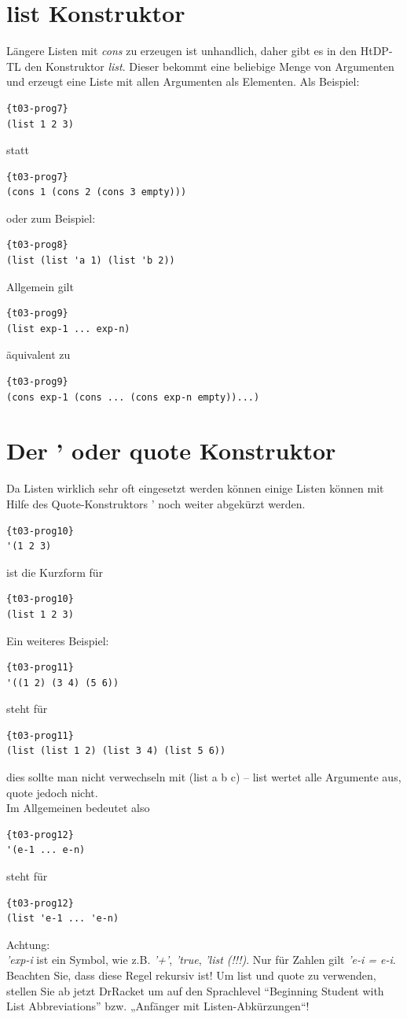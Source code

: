\section{list Konstruktor}
Längere Listen mit \textit{cons} zu erzeugen ist unhandlich, daher gibt es in den HtDP-TL den Konstruktor \textit{list}. Dieser bekommt eine beliebige Menge von Argumenten und erzeugt eine Liste mit allen Argumenten als Elementen. Als Beispiel:

\begin{lstlisting}{t03-prog7}
(list 1 2 3)
\end{lstlisting}
statt
\begin{lstlisting}{t03-prog7}
(cons 1 (cons 2 (cons 3 empty)))
\end{lstlisting}
oder zum Beispiel:
\begin{lstlisting}{t03-prog8}
(list (list 'a 1) (list 'b 2))
\end{lstlisting}

Allgemein gilt
\begin{lstlisting}{t03-prog9}
(list exp-1 ... exp-n)
\end{lstlisting}
 äquivalent zu
\begin{lstlisting}{t03-prog9}
(cons exp-1 (cons ... (cons exp-n empty))...)
\end{lstlisting}

\section{Der ' oder quote Konstruktor}
Da Listen wirklich sehr oft eingesetzt werden können einige Listen können mit Hilfe des Quote-Konstruktors ' noch weiter abgekürzt werden.
\begin{lstlisting}{t03-prog10}
'(1 2 3)
\end{lstlisting}
ist die Kurzform für
\begin{lstlisting}{t03-prog10}
(list 1 2 3)
\end{lstlisting}
Ein weiteres Beispiel:
\begin{lstlisting}{t03-prog11}
'((1 2) (3 4) (5 6))
\end{lstlisting}
steht für
\begin{lstlisting}{t03-prog11}
(list (list 1 2) (list 3 4) (list 5 6))
\end{lstlisting}
dies sollte man nicht verwechseln mit (list a b c) – list wertet alle
Argumente aus, quote jedoch nicht. \\Im Allgemeinen bedeutet also
\begin{lstlisting}{t03-prog12}
'(e-1 ... e-n)
\end{lstlisting}
steht für
\begin{lstlisting}{t03-prog12}
(list 'e-1 ... 'e-n)
\end{lstlisting}
Achtung:\\
\textit{'exp-i} ist ein Symbol, wie z.B. \textit{'+'}, \textit{'true}, \textit{'list (!!!)}. Nur für Zahlen gilt \textit{'e-i = e-i}. Beachten Sie, dass diese Regel rekursiv ist! Um list und quote zu verwenden, stellen Sie ab jetzt DrRacket um auf den Sprachlevel “Beginning Student with List Abbreviations” bzw. „Anfänger mit Listen-Abkürzungen“!

